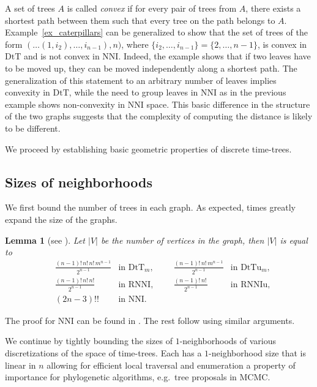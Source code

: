 \documentclass[11pt]{amsart}
\newtheorem{lemma}{Lemma}
\theoremstyle{definition}
\newcommand{\nni}{\mathrm{NNI}}
\newcommand{\rnni}{\mathrm{RNNI}}
\newcommand{\rnniu}{\mathrm{RNNIu}}
\newcommand{\dtt}{\mathrm{DtT}}
\newcommand{\dttu}{\mathrm{DtTu}}
\begin{document}
A set of trees $A$ is called \emph{convex} if for every pair of trees from $A$, there exists a shortest path between them such that every tree on the path belongs to $A$.
Example~\ref{ex_caterpillars} can be generalized to show that the set of trees of the form $(\ldots(1, i_2), \ldots, i_{n-1}), n)$, where $\{i_2, \ldots, i_{n-1}\} = \{2, \ldots, n-1\}$, is convex in $\dtt$ and is not convex in $\nni$.
Indeed, the example shows that if two leaves have to be moved up, they can be moved independently along a shortest path.
The generalization of this statement to an arbitrary number of leaves implies convexity in $\dtt$, while the need to group leaves in $\nni$ as in the previous example shows non-convexity in $\nni$ space.
This basic difference in the structure of the two graphs suggests that the complexity of computing the distance is likely to be different.

We proceed by establishing basic geometric properties of discrete time-trees.


\subsection{Sizes of neighborhoods}

We first bound the number of trees in each graph.
As expected, times greatly expand the size of the graphs.

\begin{lemma}[see \autocite{Semple2003-nj}]
\label{spaceSizes}
Let $|V|$ be the number of vertices in the graph, then $|V|$ is equal to
\begin{align*}
& \frac{(n-1)!\,n!\,n!\,m^{n-1}}{2^{n-1}}	& \mbox{in $\dtt_m$,}
&&& \frac{(n-1)!\,n!\,m^{n-1}}{2^{n-1}}		& \mbox{in $\dttu_m$,}\\
& \frac{(n-1)!\,n!\,n!}{2^{n-1}}		& \mbox{in $\rnni$,}
&&& \frac{(n-1)!\,n!\,}{2^{n-1}}		& \mbox{in $\rnniu$,}\\
& (2n - 3)!!					& \mbox{in $\nni$.}
\end{align*}
\end{lemma}

\proof
The proof for $\nni$ can be found in \autocite{Semple2003-nj}.
The rest follow using similar arguments.
\endproof

We continue by tightly bounding the sizes of $1$-neighborhoods of various discretizations of the space of time-trees.
Each has a $1$-neighborhood size that is linear in $n$ allowing for efficient local traversal and enumeration a property of importance for phylogenetic algorithms, e.g.\ tree proposals in MCMC.
\end{document}
